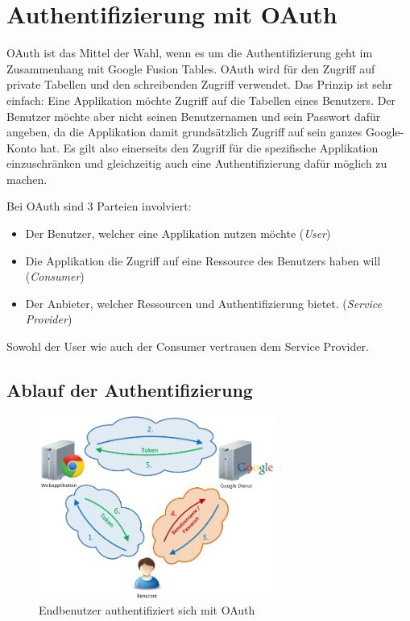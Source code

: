 \section{Authentifizierung mit OAuth}
\label{oauth}

\gls{OAuth} ist das Mittel der Wahl, wenn es um die Authentifizierung geht im Zusammenhang mit Google Fusion Tables. \gls{OAuth} wird für den Zugriff auf private Tabellen und den schreibenden Zugriff verwendet.
Das Prinzip ist sehr einfach: Eine Applikation möchte Zugriff auf die Tabellen eines Benutzers. Der Benutzer möchte aber nicht seinen Benutzernamen und sein Passwort dafür angeben, da die Applikation damit grundsätzlich Zugriff auf sein ganzes Google-Konto hat. Es gilt also einerseits den Zugriff für die spezifische Applikation einzuschränken und gleichzeitig auch eine Authentifizierung dafür möglich zu machen.

Bei \gls{OAuth} sind 3 Parteien involviert:
\begin{itemize}
\item Der Benutzer, welcher eine Applikation nutzen möchte (\emph{User})
\item Die Applikation die Zugriff auf eine Ressource des Benutzers haben will (\emph{Consumer})
\item Der Anbieter, welcher Ressourcen und Authentifizierung bietet. (\emph{Service Provider})
\end{itemize}

Sowohl der User wie auch der Consumer vertrauen dem Service Provider.

\subsection{Ablauf der Authentifizierung}
\label{oauth-authentication}

\begin{figure}[!ht]
	\centering
	\includegraphics[width=0.7\textwidth]{images/oauth/oauth-user}
	\caption{Endbenutzer authentifiziert sich mit \gls{OAuth}}
	\label{oauth-user}
\end{figure}

